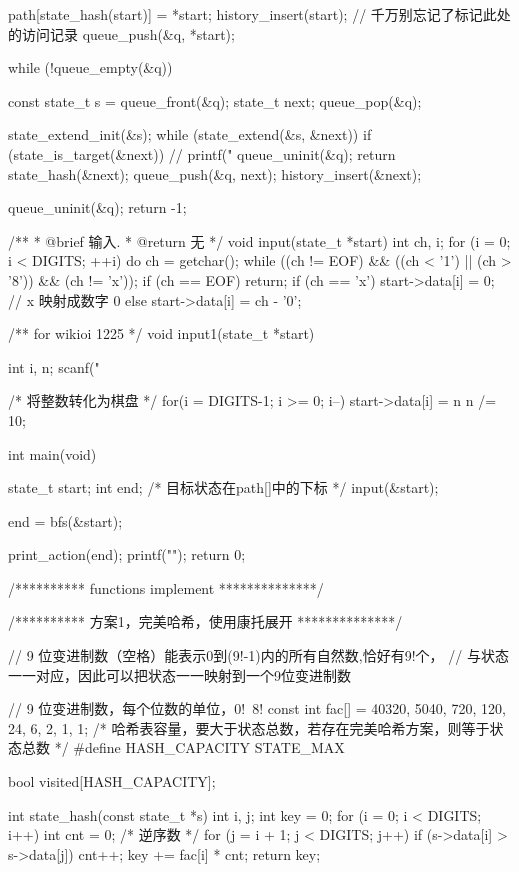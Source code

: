 \begin{Codex}[label=eight_digits_bfs.c]
{    path[state_hash(start)] = *start;
    history_insert(start); // 千万别忘记了标记此处的访问记录
    queue_push(&q, *start);

    while (!queue_empty(&q)) {
        const state_t s = queue_front(&q);
        state_t next;
        queue_pop(&q);

        state_extend_init(&s);
        while (state_extend(&s, &next)) {
            if (state_is_target(&next)) {
                // printf("%
                queue_uninit(&q);
                return state_hash(&next);
            }
            queue_push(&q, next);
            history_insert(&next);
        }
    }
    queue_uninit(&q);
    return -1;
}

/**
 * @brief 输入.
 * @return 无
 */
void input(state_t *start) {
    int ch, i;
    for (i = 0; i < DIGITS; ++i) {
        do {
            ch = getchar();
        } while ((ch != EOF) && ((ch < '1') || (ch > '8')) && (ch != 'x'));
        if (ch == EOF) return;
        if (ch == 'x') start->data[i] = 0; // x 映射成数字 0
        else           start->data[i] = ch - '0';
    }
}

/** for wikioi 1225 */
void input1(state_t *start) {
    int i, n;
    scanf("%

    /* 将整数转化为棋盘 */
    for(i = DIGITS-1; i >= 0; i--) {
        start->data[i] = n %
        n /= 10;
    }
}

int main(void) {
    state_t start;
    int end; /* 目标状态在path[]中的下标 */
    input(&start);

    end = bfs(&start);

    print_action(end);
    printf("\n");
    return 0;
}

/********** functions implement **************/

/********** 方案1，完美哈希，使用康托展开 **************/

// 9 位变进制数（空格）能表示0到(9!-1)内的所有自然数,恰好有9!个，
// 与状态一一对应，因此可以把状态一一映射到一个9位变进制数

// 9 位变进制数，每个位数的单位，0!~8!
const int fac[] = {40320, 5040, 720, 120, 24, 6, 2, 1, 1};
/* 哈希表容量，要大于状态总数，若存在完美哈希方案，则等于状态总数 */
#define HASH_CAPACITY STATE_MAX

bool visited[HASH_CAPACITY];

int state_hash(const state_t *s) {
    int i, j;
    int key = 0;
    for (i = 0; i < DIGITS; i++) {
        int cnt = 0;  /* 逆序数 */
        for (j = i + 1; j < DIGITS; j++) if (s->data[i] > s->data[j]) cnt++;
        key += fac[i] * cnt;
    }
    return key;
}


\end{Codex}
